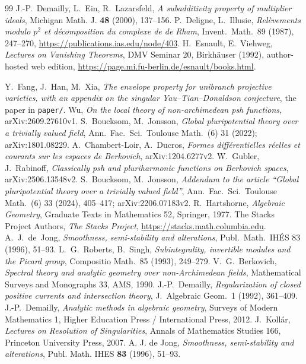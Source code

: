 \begin{thebibliography}{99}
 J.-P.~Demailly, L.~Ein, R.~Lazarsfeld,
\emph{A subadditivity property of multiplier ideals}, Michigan Math. J.
\textbf{48} (2000), 137--156.
 P.~Deligne, L.~Illusie, \emph{Rel\`evements modulo $p^2$ et d\'ecomposition du complexe de de Rham}, Invent.~Math.~89 (1987), 247--270, \url{https://publications.ias.edu/node/403}.
 H.~Esnault, E.~Viehweg, \emph{Lectures on Vanishing Theorems}, DMV Seminar 20, Birkhäuser (1992), author-hosted web edition, \url{https://page.mi.fu-berlin.de/esnault/books.html}.

 Y.~Fang, J.~Han, M.~Xia, \emph{The envelope property for unibranch projective
varieties, with an appendix on the singular Yau--Tian--Donaldson conjecture},
the paper in \texttt{paper/}.
 Wu, \emph{On the local theory of non-archimedean psh functions},
arXiv:2609.27610v1.
 S.~Boucksom, M.~Jonsson, \emph{Global pluripotential theory over a trivially
valued field}, Ann.\ Fac.\ Sci.\ Toulouse Math.\ (6) 31 (2022); arXiv:1801.08229.
 A.~Chambert-Loir, A.~Ducros, \emph{Formes diff\'erentielles r\'eelles et
courants sur les espaces de Berkovich}, arXiv:1204.6277v2.
 W.~Gubler, J.~Rabinoff, \emph{Classically psh and pluriharmonic functions on
Berkovich spaces}, arXiv:2506.13548v2.
 S.~Boucksom, M.~Jonsson, \emph{Addendum to the article ``Global pluripotential theory over a trivially valued field''}, Ann.\ Fac.\ Sci.\ Toulouse Math.\ (6) 33 (2024), 405--417; arXiv:2206.07183v2.
 R.~Hartshorne, \emph{Algebraic Geometry}, Graduate Texts in Mathematics 52, Springer, 1977.
 The Stacks Project Authors, \emph{The Stacks Project}, \url{https://stacks.math.columbia.edu}.
 A.~J.~de~Jong, \emph{Smoothness, semi-stability and alterations}, Publ.\ Math.\ IH\'ES 83 (1996), 51--93.
 L.~G.~Roberts, B.~Singh, \emph{Subintegrality, invertible modules and the Picard group}, Compositio Math.\ 85 (1993), 249--279.
 V.~G.~Berkovich, \emph{Spectral theory and analytic geometry over non-Archimedean fields}, Mathematical Surveys and Monographs 33, AMS, 1990.
 J.-P.~Demailly, \emph{Regularization of closed positive currents and intersection theory}, J.~Algebraic Geom.~1 (1992), 361--409.
 J.-P.~Demailly, \emph{Analytic methods in algebraic geometry}, Surveys of Modern Mathematics 1, Higher Education Press / International Press, 2012.
 J.~Koll\'ar, \emph{Lectures on Resolution of Singularities}, Annals of Mathematics Studies 166, Princeton University Press, 2007.
 A. J. de Jong,
\emph{Smoothness, semi-stability and alterations},
Publ. Math. IHES \textbf{83} (1996), 51--93.
\end{thebibliography}
